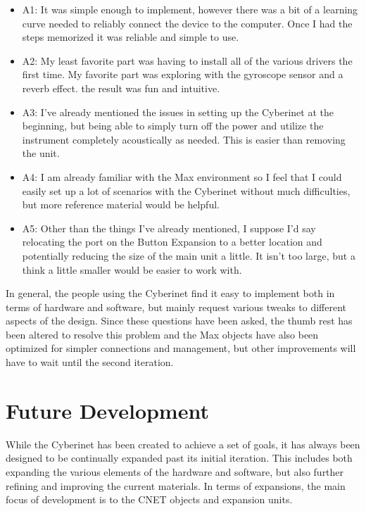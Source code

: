 \begin{itemize}
    \item A1: It was simple enough to implement, however there was a bit of a learning curve needed to reliably connect the device to the computer. Once I had the steps memorized it was reliable and simple to use.
    \item A2: My least favorite part was having to install all of the various drivers the first time. My favorite part was exploring with the gyroscope sensor and a reverb effect. the result was fun and intuitive.
    \item A3: I've already mentioned the issues in setting up the Cyberinet at the beginning, but being able to simply turn off the power and utilize the instrument completely acoustically as needed. This is easier than removing the unit.
    \item A4: I am already familiar with the Max environment so I feel that I could easily set up a lot of scenarios with the Cyberinet without much difficulties, but more reference material would be helpful. 
    \item A5: Other than the things I've already mentioned, I suppose I'd say relocating the port on the Button Expansion to a better location and potentially reducing the size of the main unit a little. It isn't too large, but a think a little smaller would be easier to work with.
\end{itemize}

In general, the people using the Cyberinet find it easy to implement both in terms of hardware and software, but mainly request various tweaks to different aspects of the design. Since these questions have been asked, the thumb rest has been altered to resolve this problem and the Max objects have also been optimized for simpler connections and management, but other improvements will have to wait until the second iteration.

\section{Future Development}

While the Cyberinet has been created to achieve a set of goals, it has always been designed to be continually expanded past its initial iteration. This includes both expanding the various elements of the hardware and software, but also further refining and improving the current materials. In terms of expansions, the main focus of development is to the CNET objects and expansion units.

